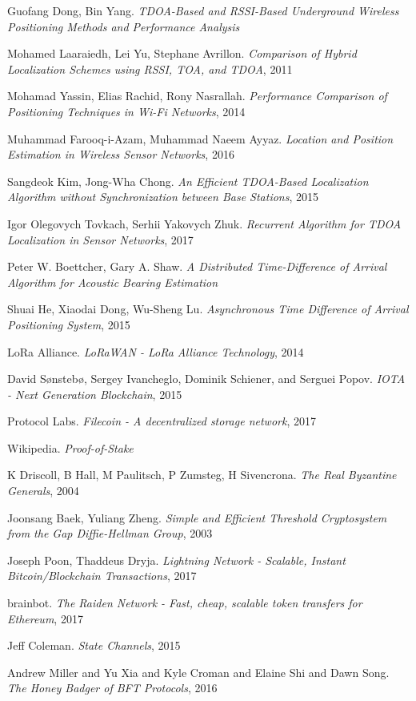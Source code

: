 \documentclass[10pt, nonatbib, nocopyrightspace, reprint]{sigplanconf}
\begin{document}
\begin{thebibliography}{10}
    Guofang Dong, Bin Yang.
    \emph{TDOA-Based and RSSI-Based Underground Wireless Positioning Methods and Performance Analysis}

    Mohamed Laaraiedh, Lei Yu, Stephane Avrillon.
    \emph{Comparison of Hybrid Localization Schemes using RSSI, TOA, and TDOA}, 2011

    Mohamad Yassin, Elias Rachid, Rony Nasrallah.
    \emph{Performance Comparison of Positioning Techniques in Wi-Fi Networks}, 2014

    Muhammad Farooq-i-Azam, Muhammad Naeem Ayyaz.
    \emph{Location and Position Estimation in Wireless Sensor Networks}, 2016

    Sangdeok Kim, Jong-Wha Chong.
    \emph{An Efficient TDOA-Based Localization Algorithm without Synchronization between Base Stations}, 2015

    Igor Olegovych Tovkach, Serhii Yakovych Zhuk.
    \emph{Recurrent Algorithm for TDOA Localization in Sensor Networks}, 2017

    Peter W. Boettcher, Gary A. Shaw.
    \emph{A Distributed Time-Difference of Arrival Algorithm for Acoustic Bearing Estimation}

    Shuai He, Xiaodai Dong, Wu-Sheng Lu.
    \emph{Asynchronous Time Difference of Arrival Positioning System}, 2015

    LoRa Alliance.
    \emph{LoRaWAN - LoRa Alliance Technology}, 2014

    David Sønstebø, Sergey Ivancheglo, Dominik Schiener, and Serguei Popov.
    \emph{IOTA - Next Generation Blockchain}, 2015

    Protocol Labs.
    \emph{Filecoin - A decentralized storage network}, 2017

    Wikipedia.
    \emph{Proof-of-Stake}

    K Driscoll, B Hall, M Paulitsch, P Zumsteg, H Sivencrona.
    \emph{The Real Byzantine Generals}, 2004

    Joonsang Baek, Yuliang Zheng.
    \emph{Simple and Efficient Threshold Cryptosystem from the Gap Diffie-Hellman Group}, 2003

    Joseph Poon, Thaddeus Dryja.
    \emph{Lightning Network - Scalable, Instant Bitcoin/Blockchain Transactions}, 2017

    brainbot.
    \emph{The Raiden Network - Fast, cheap, scalable token transfers for Ethereum}, 2017

    Jeff Coleman.
    \emph{State Channels}, 2015

    Andrew Miller and Yu Xia and Kyle Croman and Elaine Shi and Dawn Song.
    \emph{The Honey Badger of BFT Protocols}, 2016

\end{thebibliography}
\end{document}
